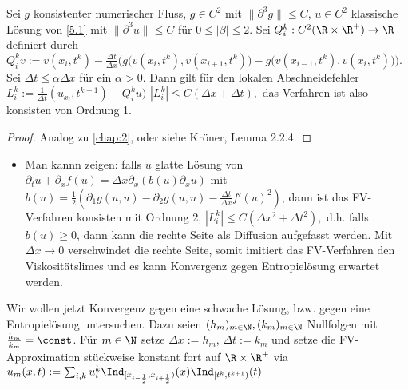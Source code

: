\begin{st}[Konsistenz] \label{5.11}
    Sei $g$ konsistenter numerischer Fluss, $g \in C^2$ mit $\|\partial^3 g\| \le C$, $u \in C^2$ klassische Lösung von \eqref{5.1} mit $\|\partial^3 u\| \le C$ für $0 \le |\beta| \le 2$.
    Sei $Q_i^k: C^2(\R \times \R^+) \to \R$ definiert durch
    \begin{math}
        Q_i^k v := v(x_i, t^k) - \frac{\Delta t}{\Delta x} \Big(g\big(v(x_i,t^k), v(x_{i+1}, t^k)\big) - g\big(v(x_{i-1}, t^k), v(x_i, t^k)\big)\Big).
    \end{math}
    Sei $\Delta t \le \alpha \Delta x$ für ein $\alpha > 0$.
    Dann gilt für den lokalen Abschneidefehler $L_i^k := \frac{1}{\Delta t} (u_{x_i}, t^{k+1}) - Q_i^k u)$
    \begin{math}
        |L_i^k| \le C (\Delta x + \Delta t),
    \end{math}
    das Verfahren ist also konsisten von Ordnung 1.
    \begin{proof}
        Analog zu \ref{chap:2}, oder siehe Kröner, Lemma 2.2.4.
    \end{proof}
    \begin{note}
        \begin{itemize}
            \item
                Man kannn zeigen: falls $u$ glatte Lösung von
                \begin{math}
                    \partial_t u + \partial_x f(u) = \Delta x \partial_x (b(u) \partial_x u)
                \end{math}
                mit $b(u) = \frac{1}{2} (\partial_1 g(u,u) - \partial_2 g(u,u) - \frac{\Delta t}{\Delta x} f'(u)^2)$, dann ist das FV-Verfahren konsisten mit Ordnung 2,
                \begin{math}
                    |L_i^k| \le C(\Delta x^2 + \Delta t^2),
                \end{math}
                d.h. falls $b(u) \ge 0$, dann kann die rechte Seite als Diffusion aufgefasst werden.
                Mit $\Delta x \to 0$ verschwindet die rechte Seite, somit imitiert das FV-Verfahren den Viskositätslimes und es kann Konvergenz gegen Entropielösung erwartet werden.
        \end{itemize}
    \end{note}
\end{st}

Wir wollen jetzt Konvergenz gegen eine schwache Lösung, bzw. gegen eine Entropielösung untersuchen.
Dazu seien $(h_m)_{m\in\N}, (k_m)_{m\in\N}$ Nullfolgen mit $\frac{h_m}{k_m} = \const$.
Für $m \in \N$ setze $\Delta x := h_m$, $\Delta t := k_m$ und setze die FV-Approximation stückweise konstant fort auf $\R \times \R^+$ via
\begin{math}
    u_m(x,t) := \sum_{i,k} u_i^k \Ind_{[x_{i-\frac{1}{2}}, x_{i+\frac{1}{2}})}(x) \Ind_{[t^k, t^{k+1})}(t)
\end{math}

